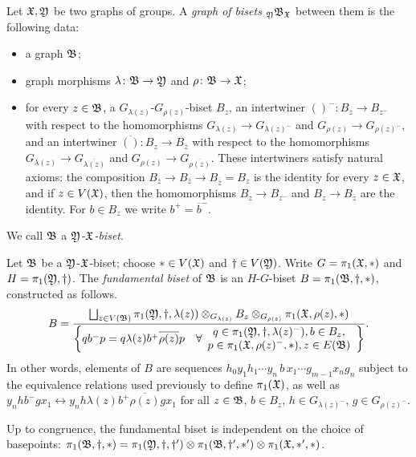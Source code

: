 \documentclass{amsart}
\begin{document}
\begin{defn}\label{defn:graphofbisets}
  Let ${\mathfrak X},{\mathfrak Y}$ be two graphs of groups. A \emph{graph of
    bisets} $\subscript \gfY\gfB_\gf$ between them is the
  following data:
  \begin{itemize}
  \item a graph ${\mathfrak B}$;
  \item graph morphisms $\lambda\colon{\mathfrak B}\to{\mathfrak Y}$ and
    $\rho\colon{\mathfrak B}\to{\mathfrak X}$;
  \item for every $z\in{\mathfrak B}$, a
    $G_{\lambda(z)}$-$G_{\rho(z)}$-biset $B_z$, an intertwiner
    $()^-\colon B_z\to B_{z^-}$ with respect to the homomorphisms
    $G_{\lambda(z)}\to G_{\lambda(z)^-}$ and
    $G_{\rho(z)}\to G_{\rho(z)^-}$, and an intertwiner
    $\overline{()}\colon B_z\to B_{\overline z}$ with respect to the
    homomorphisms $G_{\lambda(z)}\to G_{\overline{\lambda(z)}}$ and
    $G_{\rho(z)}\to G_{\overline{\rho(z)}}$. These intertwiners satisfy
    natural axioms: the composition
    $B_z\to B_{\overline z}\to B_{\overline{\overline z}}=B_z$ is the
    identity for every $z\in{\mathfrak X}$, and if $z\in V({\mathfrak X})$, then the
    homomorphisms $B_z\to B_{z^-}$ and $B_z\to B_{\overline z}$ are
    the identity. For $b\in B_z$ we write $b^+={\overline b}^-$.
  \end{itemize}
  We call ${\mathfrak B}$ a \emph{${\mathfrak Y}$-${\mathfrak X}$-biset}.
\end{defn}

\begin{defn}\label{defn:p1biset}
  Let ${\mathfrak B}$ be a ${\mathfrak Y}$-${\mathfrak X}$-biset; choose
  $*\in V({\mathfrak X})$ and $\dagger\in V({\mathfrak Y})$. Write
  $G=\pi_1({\mathfrak X},*)$ and $H=\pi_1({\mathfrak Y},\dagger)$. The
  \emph{fundamental biset} of ${\mathfrak B}$ is an $H$-$G$-biset
  $B=\pi_1({\mathfrak B},\dagger,*)$, constructed as follows.
  \begin{equation}\label{eq:freebiset}
    B=\frac{\bigsqcup_{z\in V({\mathfrak B})}\pi_1({\mathfrak Y},\dagger,\lambda(z))\otimes_{G_{\lambda(z)}}B_z\otimes_{G_{\rho(z)}}\pi_1({\mathfrak X},\rho(z),*)}{\left\{q b^-p = q\lambda(z)b^+\overline{\rho(z)}p\quad\forall\begin{array}{c}q\in\pi_1({\mathfrak Y},\dagger,\lambda(z)^-),b\in B_z,\\p\in\pi_1({\mathfrak X},\rho(z)^-,*),z\in E({\mathfrak B})\end{array}\right\}}.
  \end{equation}
  In other words, elements of $B$ are sequences
  $h_0y_1h_1\cdots y_n\,b\,x_1\cdots g_{m-1} x_n g_n$ subject to the
  equivalence relations used previously to define $\pi_1({\mathfrak X})$, as
  well as
  $y_n h b^-g x_1\leftrightarrow y_n h\lambda(z)b^+\overline{\rho(z)}g x_1$
  for all $z\in{\mathfrak B}$, $b\in B_z$, $h\in G_{\lambda(z)^-}$,
  $g\in G_{\rho(z)^-}$.
\end{defn}
\noindent Up to congruence, the fundamental biset is independent on
the choice of basepoints:
$\pi_1({\mathfrak B}, \dagger,*)= \pi_1({\mathfrak Y},
\dagger,\dagger')\otimes \pi_1({\mathfrak B}, \dagger',*') \otimes
\pi_1({\mathfrak X}, *',*)$.
\end{document}
